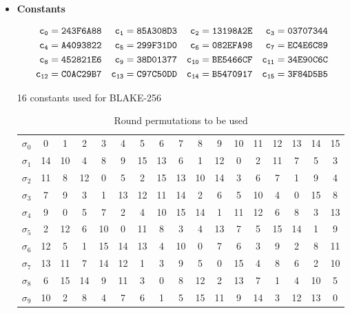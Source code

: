   \begin{itemize}
    \item {\bf Constants}
      
      \begin{table}[H]
        \begin{align*}
             {\tt c_{0}}  &= {\tt 243F6A88} & {\tt c_{1}}  &= {\tt 85A308D3} & {\tt c_{2}}  &= {\tt 13198A2E} & {\tt c_{3}}  &= {\tt 03707344}
          \\ {\tt c_{4}}  &= {\tt A4093822} & {\tt c_{5}}  &= {\tt 299F31D0} & {\tt c_{6}}  &= {\tt 082EFA98} & {\tt c_{7}}  &= {\tt EC4E6C89} 
          \\ {\tt c_{8}}  &= {\tt 452821E6} & {\tt c_{9}}  &= {\tt 38D01377} & {\tt c_{10}} &= {\tt BE5466CF} & {\tt c_{11}} &= {\tt 34E90C6C} 
          \\ {\tt c_{12}} &= {\tt C0AC29B7} & {\tt c_{13}} &= {\tt C97C50DD} & {\tt c_{14}} &= {\tt B5470917} & {\tt c_{15}} &= {\tt 3F84D5B5} 
        \end{align*}
        \caption{16 constants used for BLAKE-256 \cite{00002}}
      \end{table}

      \begin{table}
        \begin{center}
          \begin{tabular}{ c| *{16}{c}} \hline
            $\sigma_{0}$ & 0  & 1  & 2  & 3  & 4  & 5  & 6  & 7  & 8  & 9  & 10 & 11 & 12 & 13 & 14 & 15 \\
            $\sigma_{1}$ & 14 & 10 & 4  & 8  & 9  & 15 & 13 & 6  & 1  & 12 & 0  & 2  & 11 & 7  & 5  & 3  \\
            $\sigma_{2}$ & 11 & 8  & 12 & 0  & 5  & 2  & 15 & 13 & 10 & 14 & 3  & 6  & 7  & 1  & 9  & 4  \\
            $\sigma_{3}$ & 7  & 9  & 3  & 1  & 13 & 12 & 11 & 14 & 2  & 6  & 5  & 10 & 4  & 0  & 15 & 8  \\
            $\sigma_{4}$ & 9  & 0  & 5  & 7  & 2  & 4  & 10 & 15 & 14 & 1  & 11 & 12 & 6  & 8  & 3  & 13 \\
            $\sigma_{5}$ & 2  & 12 & 6  & 10 & 0  & 11 & 8  & 3  & 4  & 13 & 7  & 5  & 15 & 14 & 1  & 9  \\
            $\sigma_{6}$ & 12 & 5  & 1  & 15 & 14 & 13 & 4  & 10 & 0  & 7  & 6  & 3  & 9  & 2  & 8  & 11 \\
            $\sigma_{7}$ & 13 & 11 & 7  & 14 & 12 & 1  & 3  & 9  & 5  & 0  & 15 & 4  & 8  & 6  & 2  & 10 \\
            $\sigma_{8}$ & 6  & 15 & 14 & 9  & 11 & 3  & 0  & 8  & 12 & 2  & 13 & 7  & 1  & 4  & 10 & 5  \\
            $\sigma_{9}$ & 10 & 2  & 8  & 4  & 7  & 6  & 1  & 5  & 15 & 11 & 9  & 14 & 3  & 12 & 13 & 0  \\ \hline
          \end{tabular}
          \caption{Round permutations to be used \cite{00002}}
        \end{center}
      \end{table}
    

\end{itemize}
